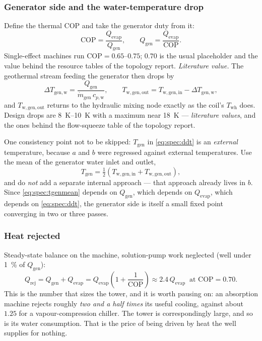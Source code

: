 \documentclass[11pt]{article}
\newcommand{\md}{\ensuremath{\dot m}}
\begin{document}
\subsubsection{Generator side and the water-temperature drop}
Define the thermal COP and take the generator duty from it:
\begin{equation}
\mathrm{COP} = \frac{Q_{\mathrm{evap}}}{Q_{\mathrm{gen}}} ,
\qquad
Q_{\mathrm{gen}} = \frac{Q_{\mathrm{evap}}}{\mathrm{COP}} .
\label{eq:spec:qgen}
\end{equation}
Single-effect machines run $\mathrm{COP}=\numrange{0.65}{0.75}$; $0.70$ is the usual placeholder and
the value behind the resource tables of the topology report. \emph{Literature value.} The geothermal
stream feeding the generator then drops by
\begin{equation}
\Delta T_{\mathrm{gen,w}} = \frac{Q_{\mathrm{gen}}}{\md_{\mathrm{gen}}\,c_{p,\mathrm{w}}} ,
\qquad
T_{\mathrm{w,gen,out}} = T_{\mathrm{w,gen,in}} - \Delta T_{\mathrm{gen,w}} ,
\label{eq:spec:dtgen}
\end{equation}
and $T_{\mathrm{w,gen,out}}$ returns to the hydraulic mixing node exactly as the coil's
$T_{\mathrm{wh}}$ does. Design drops are \SIrange{8}{10}{\kelvin} with a maximum near
\SI{18}{\kelvin} --- \emph{literature values}, and the ones behind the flow-squeeze table of the
topology report.

One consistency point not to be skipped: $T_{\mathrm{gen}}$ in \eqref{eq:spec:ddt} is an
\emph{external} temperature, because $a$ and $b$ were regressed against external temperatures. Use
the mean of the generator water inlet and outlet,
\begin{equation}
T_{\mathrm{gen}} = \tfrac{1}{2}\left(T_{\mathrm{w,gen,in}} + T_{\mathrm{w,gen,out}}\right) ,
\label{eq:spec:tgenmean}
\end{equation}
and do \emph{not} add a separate internal approach --- that approach already lives in $b$. Since
\eqref{eq:spec:tgenmean} depends on $Q_{\mathrm{gen}}$, which depends on $Q_{\mathrm{evap}}$, which
depends on \eqref{eq:spec:ddt}, the generator side is itself a small fixed point converging in two or
three passes.

\subsubsection{Heat rejected}
Steady-state balance on the machine, solution-pump work neglected (well under \SI{1}{\percent} of
$Q_{\mathrm{gen}}$):
\begin{equation}
Q_{\mathrm{rej}} = Q_{\mathrm{gen}} + Q_{\mathrm{evap}}
 = Q_{\mathrm{evap}}\left(1+\frac{1}{\mathrm{COP}}\right)
 \approx 2.4\,Q_{\mathrm{evap}} \ \text{ at } \mathrm{COP}=0.70 .
\label{eq:spec:qrej}
\end{equation}
This is the number that sizes the tower, and it is worth pausing on: an absorption machine rejects
roughly \emph{two and a half times} its useful cooling, against about $1.25$ for a
vapour-compression chiller. The tower is correspondingly large, and so is its water consumption. That
is the price of being driven by heat the well supplies for nothing.
\end{document}
